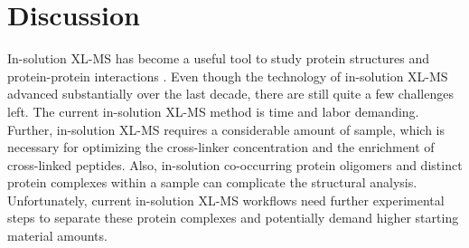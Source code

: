 \section{Discussion}
In-solution XL-MS has become a useful tool to study protein structures and protein-protein interactions \cite{Henry_2018, Koukos_2020, Liu_2014}. Even though the technology of in-solution XL-MS advanced substantially over the last decade, there are still quite a few challenges left. The current in-solution XL-MS method is time and labor demanding. Further, in-solution XL-MS requires a considerable amount of sample, which is necessary for optimizing the cross-linker concentration and the enrichment of cross-linked peptides. Also, in-solution co-occurring protein oligomers and distinct protein complexes within a sample can complicate the structural analysis. Unfortunately, current in-solution XL-MS workflows need further experimental steps to separate these protein complexes and potentially demand higher starting material amounts.

